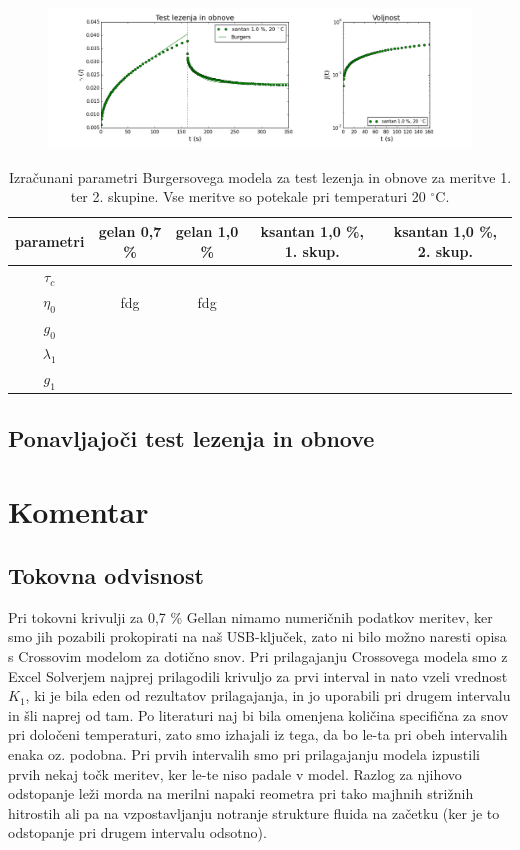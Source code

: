 \documentclass{article}
\begin{document}
\begin{figure}
  \centering
  \includegraphics[width=\linewidth]{S2creep.png}
  \caption{}
  \label{fig:creep2}
\end{figure}

\renewcommand{\arraystretch}{1.2}
\begin{table} 
\centering
\caption{Izračunani parametri Burgersovega modela za test lezenja in obnove za meritve 1. ter 2. skupine. Vse meritve so potekale pri temperaturi 20 $^\circ$C.}
\label{tab:creep}
\begin{tabular}{ccccc}
\toprule
   parametri & gelan 0,7 \% & gelan 1,0 \% & ksantan 1,0 \%, 1. skup. & ksantan 1,0 \%, 2. skup. \\ 
   \midrule
   $\tau_c$  &  & &  &  \\ 
   \hline
   $\eta_0$ &fdg&fdg&&  \\
   $g_0$ &&&&  \\
   $\lambda_1$ &&&& \\
   $g_1$ &&&&  \\
   \bottomrule
\end{tabular}
\end{table}

\subsection{Ponavljajoči test lezenja in obnove}


\section{Komentar}
\subsection{Tokovna odvisnost}
Pri tokovni krivulji za 0,7 \% Gellan nimamo numeričnih podatkov meritev, ker smo jih pozabili prokopirati na naš USB-ključek, zato ni bilo možno naresti opisa s Crossovim modelom za dotično snov. Pri prilagajanju Crossovega modela smo z Excel Solverjem najprej prilagodili krivuljo za prvi interval in nato vzeli vrednost $K_1$, ki je bila eden od rezultatov prilagajanja, in jo uporabili pri drugem intervalu in šli naprej od tam. Po literaturi naj bi bila omenjena količina specifična za snov pri določeni temperaturi, zato smo izhajali iz tega, da bo le-ta pri obeh intervalih enaka oz. podobna. Pri prvih intervalih smo pri prilagajanju modela izpustili prvih nekaj točk meritev, ker le-te niso padale v model. Razlog za njihovo odstopanje leži morda na merilni napaki reometra pri tako majhnih strižnih hitrostih ali pa na vzpostavljanju notranje strukture fluida na začetku (ker je to odstopanje pri drugem intervalu odsotno).
\end{document}

